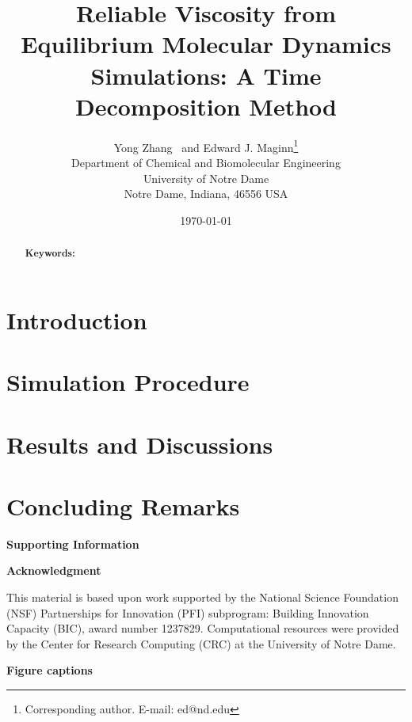 \documentclass[12pt]{article}
\title{Reliable Viscosity from Equilibrium Molecular Dynamics Simulations: A Time Decomposition Method}
\author{Yong Zhang \ and Edward J. Maginn\thanks{Corresponding author. E-mail: ed@nd.edu} \\
                Department of Chemical and Biomolecular Engineering\\
                University of Notre Dame\\
                Notre Dame, Indiana, 46556 USA}
\date{\today}
\begin{document}

\maketitle

\newpage
\begin{abstract}


{\bf Keywords:} 

\end{abstract}

\newpage
\section{Introduction}



\section{Simulation Procedure}

\section{Results and Discussions}

\section{Concluding Remarks}

\vspace{7 mm}
{\bf\Large Supporting Information}


\vspace{7 mm}
{\bf\Large Acknowledgment}

This material is based upon work supported by
the National Science Foundation (NSF) Partnerships for Innovation (PFI) subprogram:
Building Innovation Capacity (BIC), award number 1237829.
Computational resources were provided by the Center for Research Computing (CRC) at the University of Notre Dame.


\newpage
\clearpage

%

%
%






\newpage
\clearpage
{\bf\Large Figure captions}
\vspace{7 mm}


\end{document}
